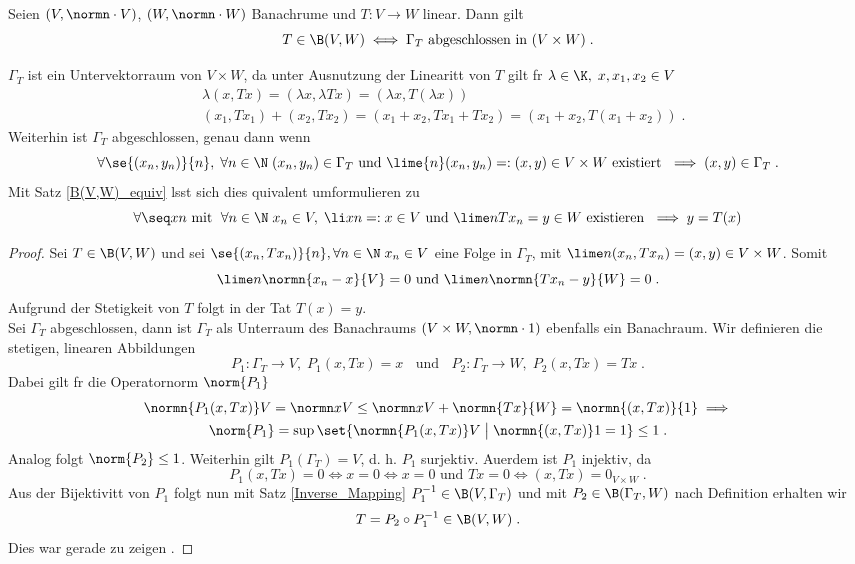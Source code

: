 \begin{theorem}
Seien \((V,\normn\cdot V)\), \((W,\normn\cdot W)\) Banachr\as ume und \(T:V\to W\) linear. Dann gilt
\[T \in \B(V,W) \iff \Gamma_T \text{ abgeschlossen in }(V\times W)\;.\]
\label{closed_graph}
\end{theorem}
\begin{rem}
	\(\Gamma_T\) ist ein Untervektorraum von \(V\times W\), da unter Ausnutzung der Linearit\as t von $T$ gilt f\us r \(\lambda \in \K,\; x, x_1, x_2 \in V\)
	\begin{align*}
		& \lambda (x, Tx) = (\lambda x, \lambda Tx) = (\lambda x, T(\lambda x)) \\
		& (x_1, Tx_1) + (x_2, Tx_2) = (x_1 + x_2, Tx_1 + Tx_2) = (x_1 + x_2, T(x_1 + x_2))\;.
	\end{align*}
	Weiterhin ist \(\Gamma_T\) abgeschlossen, genau dann wenn 
	\[\forall \se{(x_n, y_n)}{n},\;\forall n\in\N \;(x_n, y_n) \in \Gamma_T \text{ und } \lime{n} (x_n, y_n) =:(x,y) \in V\times W \text{ existiert } \implies (x,y) \in \Gamma_T\;.\]
	Mit Satz \ref{B(V,W)_equiv} l\as sst sich dies \as quivalent umformulieren zu
	\[\forall \seq xn \text{ mit }\;\forall n\in \N\; x_n \in V,\;\li xn =: x \in V  \text{ und } \lime n {Tx_n} = y \in W\text{ existieren } \implies y = T(x)\]
\end{rem}
\begin{proof}
	\happybegin
	\forw Sei \(T\in \B(V,W)\) und sei \(\se{(x_n, Tx_n)}{n}, \forall n\in \N\; x_n \in V\) eine Folge in \(\Gamma_T\), mit \(\lime n (x_n, Tx_n) = (x,y) \in V\times W\).  Somit 
	\[\lime n\normn{x_n - x}{V}  = 0 \text{ und } \lime n \normn{Tx_n - y}{W} = 0\;.\]
	Aufgrund der Stetigkeit von $T$ folgt in der Tat \(T(x) = y\).\\
	\backw Sei \(\Gamma_T\) abgeschlossen, dann ist \(\Gamma_T\) als Unterraum des Banachraums \((V\times W,\normn\cdot 1)\) ebenfalls ein Banachraum. Wir definieren die stetigen, linearen Abbildungen
	\[P_1: \Gamma_T \to V,\; P_1(x,Tx) = x \;\;\text{ und }\;\; P_2: \Gamma_T\to W,\; P_2(x,Tx) = Tx\;.\]
	Dabei gilt f\us r die Operatornorm $\norm{P_1}$
	\begin{multline*}
	\normn{P_1(x,Tx)}V = \normn xV \leq \normn xV + \normn{Tx}{W} = \normn{(x,Tx)}{1} \implies \\ \norm{P_1} = \sup \set{ \normn{P_1(x,Tx)}V\;\big\vert\;\normn{(x,Tx)}1 = 1}\leq 1\;.
	\end{multline*}
	Analog folgt \(\norm{P_2} \leq 1\). Weiterhin gilt \(P_1(\Gamma_T) = V\), d. h. $P_1$ surjektiv. Au\s erdem ist $P_1$ injektiv, da
	\[P_1(x,Tx) = 0 \iff x = 0 \iff x = 0 \text{ und } Tx = 0 \iff (x,Tx) = 0_{V\times W}\;.\]
	Aus der Bijektivit\as t von $P_1$ folgt nun mit Satz \ref{Inverse_Mapping} \(P_1^{-1} \in \B(V,\Gamma_T)\) und mit \(P_2 \in \B(\Gamma_T, W)\) nach Definition erhalten wir 
	\[T = P_2 \circ P_1^{-1} \in \B(V,W)\;.\]
	Dies war  gerade zu zeigen \happyend.
\end{proof}

